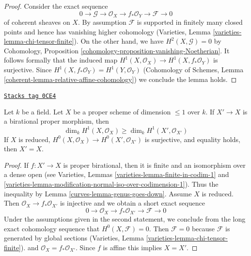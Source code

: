 \begin{proof}
Consider the exact sequence
$$
0 \to \mathcal{G} \to \mathcal{O}_X \to f_*\mathcal{O}_Y \to \mathcal{F} \to 0
$$
of coherent sheaves on $X$.
By assumption $\mathcal{F}$ is supported in finitely many closed points
and hence has vanishing higher cohomology
(Varieties, Lemma \ref{varieties-lemma-chi-tensor-finite}).
On the other hand, we have $H^2(X, \mathcal{G}) = 0$ by
Cohomology, Proposition \ref{cohomology-proposition-vanishing-Noetherian}.
It follows formally that the induced map
$H^1(X, \mathcal{O}_X) \to H^1(X, f_*\mathcal{O}_Y)$
is surjective. Since $H^1(X, f_*\mathcal{O}_Y) = H^1(Y, \mathcal{O}_Y)$
(Cohomology of Schemes, Lemma \ref{coherent-lemma-relative-affine-cohomology})
we conclude the lemma holds.
\end{proof}

\begin{lemma}
\label{curves-lemma-genus-normalization}
\href{https://stacks.math.columbia.edu/tag/0CE4}{\texttt{Stacks tag 0CE4}}

Let $k$ be a field. Let $X$ be a proper scheme of dimension $\leq 1$ over $k$.
If $X' \to X$ is a birational proper morphism, then
$$
\dim_k H^1(X, \mathcal{O}_X) \geq \dim_k H^1(X', \mathcal{O}_{X'})
$$
If $X$ is reduced, $H^0(X, \mathcal{O}_X) \to H^0(X', \mathcal{O}_{X'})$
is surjective, and equality holds, then $X' = X$.
\end{lemma}

\begin{proof}

If $f : X' \to X$ is proper birational, then it is finite and
an isomorphism over a dense open (see
Varieties, Lemmas \ref{varieties-lemma-finite-in-codim-1} and
\ref{varieties-lemma-modification-normal-iso-over-codimension-1}).
Thus the inequality by Lemma \ref{curves-lemma-genus-goes-down}.
Assume $X$ is reduced. Then $\mathcal{O}_X \to f_*\mathcal{O}_{X'}$
is injective and we obtain a short exact sequence
$$
0 \to \mathcal{O}_X \to f_*\mathcal{O}_{X'} \to \mathcal{F} \to 0
$$
Under the assumptions given in the second statement,
we conclude from the long exact cohomology sequence that
$H^0(X, \mathcal{F}) = 0$. Then $\mathcal{F} = 0$ because
$\mathcal{F}$ is generated by global sections
(Varieties, Lemma \ref{varieties-lemma-chi-tensor-finite}).
and $\mathcal{O}_X = f_*\mathcal{O}_{X'}$. Since $f$ is affine
this implies $X = X'$.
\end{proof}

